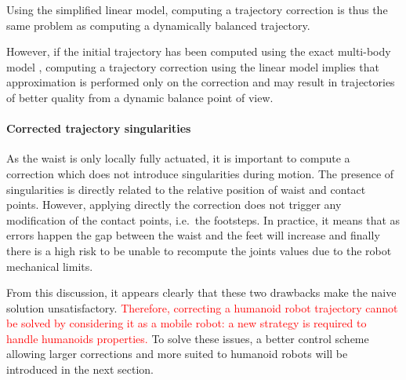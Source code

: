 Using the simplified linear model, computing a trajectory correction is thus
the same problem as computing a dynamically balanced trajectory.

However, if the initial trajectory has been computed using the exact
multi-body model \cite{FIXME}, computing a trajectory correction using
the linear model implies that approximation is performed only on the
correction and may result in trajectories of better quality from a
dynamic balance point of view.

\paragraph{Corrected trajectory singularities}
As the waist is only locally fully actuated, it is important to compute
a correction which does not introduce singularities during motion. The
presence of singularities is directly related to the relative position
of waist and contact points. However, applying directly the correction
does not trigger any modification of the contact points, i.e.\ the
footsteps. In practice, it means that as errors happen the gap between
the waist and the feet will increase and finally there is a high risk
to be unable to recompute the joints values due to the robot
mechanical limits.


From this discussion, it appears clearly that these two drawbacks make
the naive solution unsatisfactory. \textcolor{red}{Therefore,
  correcting a humanoid robot trajectory cannot be solved by
  considering it as a mobile robot: a new strategy is required to
  handle humanoids properties.}  To solve these issues, a better
control scheme allowing larger corrections and more suited to humanoid
robots will be introduced in the next section.


\FloatBarrier

